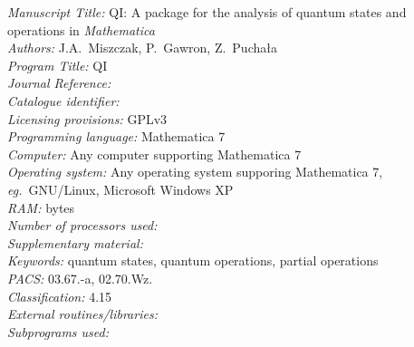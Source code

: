 \documentclass{elsart}
\newcounter{bla}
\newcommand{\Mathematica}{\emph{Mathematica}}
\newcommand{\1}{{\rm 1\hspace{-0.9mm}l}}
\newcommand{\qi}{QI}
\newcommand{\eg}{\emph{eg.}}
\begin{document}
\begin{small}
\noindent
{\em Manuscript Title:} \qi: A package for the analysis of quantum states and operations in
\Mathematica\\
{\em Authors:} J.A.~Miszczak, P.~Gawron, Z.~Pucha{\l}a \\
{\em Program Title:} QI \\
{\em Journal Reference:}                                      \\
{\em Catalogue identifier:}                                   \\
{\em Licensing provisions:} GPLv3 \\
{\em Programming language:} Mathematica 7\\
{\em Computer:} Any computer supporting Mathematica 7\\
{\em Operating system:} Any operating system supporing Mathematica 7, \eg\ GNU/Linux, Microsoft Windows XP\\
{\em RAM:} bytes                                              \\
{\em Number of processors used:}                              \\
{\em Supplementary material:}                                 \\
{\em Keywords:} quantum states, quantum operations, partial operations  \\
{\em PACS:} 03.67.-a, 02.70.Wz.\\
{\em Classification:} 4.15 \\
{\em External routines/libraries:}                                      \\
{\em Subprograms used:}                                       \\


\end{small}
\end{document}
